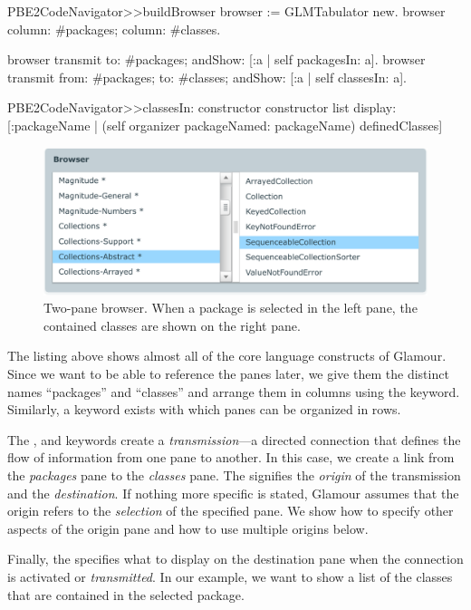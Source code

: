 \documentclass[a4paper,10pt,twoside]{book}
\begin{document}
\begin{code}{}
PBE2CodeNavigator>>buildBrowser
  browser := GLMTabulator new.
  browser
    column: #packages;
    column: #classes.

  browser transmit to: #packages; andShow: [:a | self packagesIn: a].
  browser transmit from: #packages; to: #classes; andShow: [:a | self classesIn: a].

PBE2CodeNavigator>>classesIn: constructor
  constructor list
    display: [:packageName | (self organizer packageNamed: packageName) definedClasses]
\end{code}

\begin{figure}[htbp]
  \centerline{\includegraphics[width=\linewidth]{showclasses.pdf}}
  \caption{Two-pane browser. When a package is selected in the left
    pane, the contained classes are shown on the right pane.}
  \label{fig:showclasses}
\end{figure}

The listing above shows almost all of the core language constructs of
Glamour. Since we want to be able to reference the panes later, we
give them the distinct names ``packages'' and ``classes'' and arrange them
in columns using the  keyword. Similarly, a 
keyword exists with which panes can be organized in rows.

The ,  and  keywords create a
\emph{transmission}---a directed connection that defines the flow of
information from one pane to another. In this case, we create a link
from the \emph{packages} pane to the \emph{classes} pane. The
 signifies the \emph{origin} of the transmission and
 the \emph{destination}. If nothing more specific is stated,
Glamour assumes that the origin refers to the \emph{selection} of the
specified pane. We show how to specify other aspects of the origin
pane and how to use multiple origins below.

Finally, the  specifies what to display on the destination
pane when the connection is activated or \emph{transmitted}. In our
example, we want to show a list of the classes that are contained in
the selected package.
\end{document}
